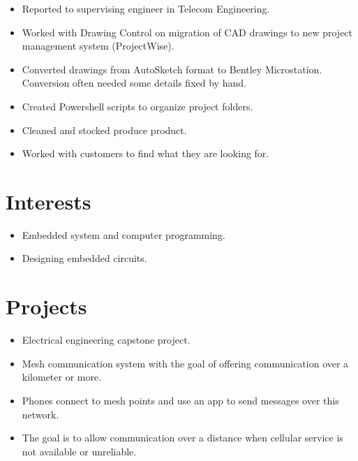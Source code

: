 \documentclass{lsanche_cv}
\begin{document}
\begin{multicols*}{2}
    \divider

    \begin{itemize}
      \item Reported to supervising engineer in Telecom Engineering.
      \item Worked with Drawing Control on migration of CAD drawings to new project management system (ProjectWise).
      \item Converted drawings from AutoSketch format to Bentley Microstation. Conversion often needed some details fixed by hand.
      \item Created Powershell scripts to organize project folders.
    \end{itemize}

    \divider
    
    \begin{itemize}
      \item Cleaned and stocked produce product.
      \item Worked with customers to find what they are looking for.
    \end{itemize}

    \columnbreak
    
  \section{Interests}
    \begin{itemize}
      \item Embedded system and computer programming.
      \item Designing embedded circuits.
    \end{itemize}

    \section{Projects}

      \begin{itemize}
        \item Electrical engineering capstone project.
        \item Mesh communication system with the goal of offering communication over a kilometer or more. 
        \item Phones connect to mesh points and use an app to send messages over this network.
        \item The goal is to allow communication over a distance when cellular service is not available or unreliable.
      \end{itemize}


\end{multicols*}
\end{document}
